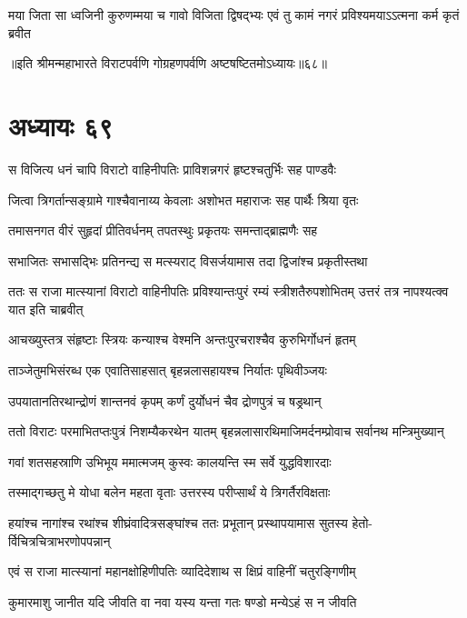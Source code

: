 \twolineshloka
{मया जिता सा ध्वजिनी कुरुणम्मया च गावो विजिता द्विषद्भ्यः}
{एवं तु कामं नगरं प्रविश्यमयाऽऽत्मना कर्म कृतं ब्रवीत}

॥इति श्रीमन्महाभारते विराटपर्वणि गोग्रहणपर्वणि अष्टषष्टितमोऽध्यायः॥६८॥

\chapter{अध्यायः ६९}

\twolineshloka
{स विजित्य धनं चापि विराटो वाहिनीपतिः}
{प्राविशन्नगरं हृष्टश्चतुर्भिः सह पाण्डवैः}


\twolineshloka
{जित्वा त्रिगर्तान्सङ्ग्रामे गाश्चैवानाय्य केवलाः}
{अशोभत महाराजः सह पार्थैः श्रिया वृतः}


\twolineshloka
{तमासनगत वीरं सुहृदां प्रीतिवर्धनम्}
{तपतस्थुः प्रकृतयः समन्ताद्ब्राह्मणैः सह}


\twolineshloka
{सभाजितः सभासद्भिः प्रतिनन्द्य स मत्स्यराट्}
{विसर्जयामास तदा द्विजांश्च प्रकृतीस्तथा}


\threelineshloka
{ततः स राजा मात्स्यानां विराटो वाहिनीपतिः}
{प्रविश्यान्तःपुरं रम्यं स्त्रीशतैरुपशोभितम्}
{उत्तरं तत्र नापश्यत्क्व यात इति चाब्रवीत्}


\twolineshloka
{आचख्युस्तत्र संहृष्टाः स्त्रियः कन्याश्च वेश्मनि}
{अन्तःपुरचराश्चैव कुरुभिर्गोधनं हृतम्}


\twolineshloka
{ताञ्जेतुमभिसंरब्ध एक एवातिसाहसात्}
{बृहन्नलासहायश्च निर्यातः पृथिवीञ्जयः}


\twolineshloka
{उपयातानतिरथान्द्रोणं शान्तनवं कृपम्}
{कर्णं दुर्योधनं चैव द्रोणपुत्रं च षड्रथान्}


\twolineshloka
{ततो विराटः परमाभितप्तःपुत्रं निशम्यैकरथेन यातम्}
{बृहन्नलासारथिमाजिमर्दनम्प्रोवाच सर्वानथ मन्त्रिमुख्यान्}


\twolineshloka
{गवां शतसहस्राणि उभिभूय ममात्मजम्}
{कुस्वः कालयन्ति स्म सर्वे युद्धविशारदाः}


\twolineshloka
{तस्माद्गच्छतु मे योधा बलेन महता वृताः}
{उत्तरस्य परीप्सार्थं ये त्रिगर्तैरविक्षताः}



\twolineshloka
{हयांश्च नागांश्च रथांश्च शीघ्रंवादित्रसङ्घांश्च ततः प्रभूतान्}
{प्रस्थापयामास सुतस्य हेतो-र्विचित्रचित्राभरणोपपन्नान्}


\twolineshloka
{एवं स राजा मात्स्यानां महानक्षोहिणीपतिः}
{व्यादिदेशाथ स क्षिप्रं वाहिनीं चतुरङ्गिणीम्}


\twolineshloka
{कुमारमाशु जानीत यदि जीवति वा नवा}
{यस्य यन्ता गतः षण्डो मन्येऽहं स न जीवति}


